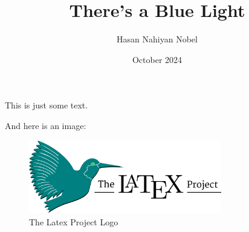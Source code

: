 \documentclass[11pt, a4paper]{article}
\title{There's a Blue Light}
\author{Hasan Nahiyan Nobel}
\date{October 2024}
\begin{document}
    \maketitle

    This is just some text.\par
    And here is an image:
    \begin{figure}[h]
        \centering
        \includegraphics[width=0.75\textwidth]{latex_project_logo}
        \caption{The Latex Project Logo}
        \label{fig:latex_project_logo}
    \end{figure}
\end{document}

